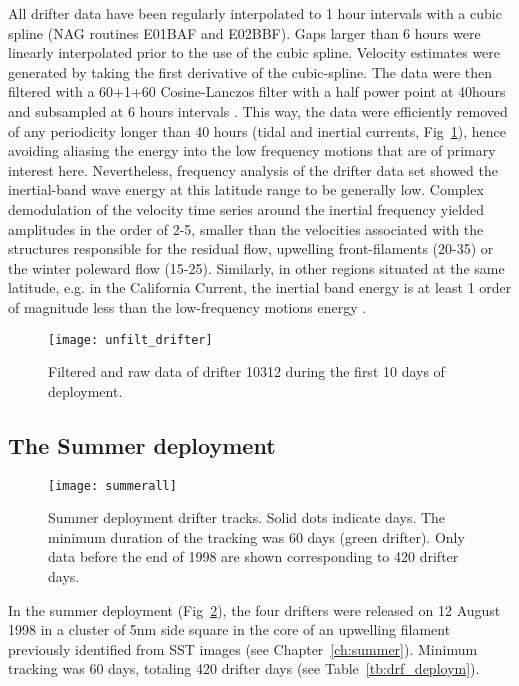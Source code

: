 All drifter data have been regularly interpolated to 1 hour
intervals with a cubic spline (NAG routines E01BAF and E02BBF).
Gaps larger than 6 hours were linearly interpolated prior to the
use of the cubic spline. Velocity estimates were generated by
taking the first derivative of the cubic-spline. The data were
then filtered with a 60+1+60 Cosine-Lanczos filter with a half
power point at 40hours and subsampled at 6 hours intervals
\citep{Haynes91}. This way, the data were efficiently removed of
any periodicity longer than 40 hours (tidal and inertial currents,
Fig~\ref{fig:drf_filter}), hence avoiding aliasing the energy into
the low frequency motions that are of primary interest here.
Nevertheless, frequency analysis of the drifter data set showed
the inertial-band wave energy at this latitude range to be
generally low. Complex demodulation of the velocity time series
around the inertial frequency yielded amplitudes in the order of
2-5\velc, smaller than the velocities associated with the
structures responsible for the residual flow, upwelling
front-filaments (20-35\velc) or the winter poleward flow
(15-25\velc). Similarly, in other regions situated at the same
latitude, e.g. in the California Current, the inertial band energy
is at least 1 order of magnitude less than the low-frequency
motions energy \citep{Swenson96}.


\begin{figure}
\centering \arribacap
\texttt{[image: unfilt\_drifter]}%
\caption{Filtered and raw data of drifter 10312
during the first 10 days of deployment.} %
\label{fig:drf_filter}
\end{figure}


\subsection{The Summer deployment}
\begin{figure}
\centering \arribacap
\texttt{[image: summerall]}%
\caption{Summer deployment drifter tracks. Solid dots indicate
days. The minimum duration of the tracking was 60 days (green
drifter). Only data before the end
of 1998 are shown corresponding to 420 drifter days.} %
\label{fig:drf_summerall}
\end{figure}

In the summer deployment (Fig~\ref{fig:drf_summerall}), the four
drifters were released on 12 August 1998 in a cluster of 5nm side
square in the core of an upwelling filament previously identified
from SST images (see Chapter~\ref{ch:summer}). Minimum tracking
was 60 days, totaling 420 drifter days (see
Table~\ref{tb:drf_deploym}).

